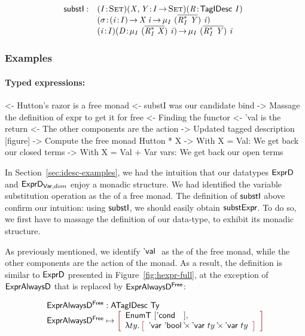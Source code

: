 \[
\begin{array}{@{}ll}
\substI : & \PITEL{\V{I}}{\Set}
            \PITEL{\V{X}, \V{Y}}{\V{I} \To \Set}
            \PITEL{\V{R}}{\TagIDesc{\V{I}}} \\
          & \PITEL{\V{\sigma}}{\PI{\V{i}}{\V{I}} \V{X}\:\V{i} \To 
                               \IMu{I}{(\toIDesc{\FreeIMonad{\V{R}}{\V{I}}{\V{Y}}})}{\V{i}}} \\
          & \PITEL{\V{i}}{\V{I}}
            \PITEL{\V{D}}{\IMu{I}{(\toIDesc{\FreeIMonad{\V{R}}{\V{I}}{\V{X}}})}{\V{i}}} \To
            \IMu{I}{(\toIDesc{\FreeIMonad{\V{R}}{\V{I}}{\V{Y}}})}{\V{i}}
\end{array}
\]


\subsubsection{Examples}

\paragraph{Typed expressions:}

\begin{wstructure}
<- Hutton's razor is a free monad
    <- substI was our candidate bind
        -> Massage the definition of expr to get it for free
    <- Finding the functor
        <- 'val is the return
        <- The other components are the action
        -> Updated tagged description [figure]
    -> Compute the free monad Hutton * X
        -> With X = Val: We get back our closed terms
        -> With X = Val + Var vars: We get back our open terms
\end{wstructure}

In Section~\ref{sec:idesc-examples}, we had the intuition that our
datatypes $\HExprD$ and $\HExprVarD{dom}$ enjoy a monadic structure. We had
identified the variable substitution operation as the \bind of a free
monad. The definition of $\substI$ above confirm our intuition: using
$\substI$, we should easily obtain $\substH$. To do so, we first have
to massage the definition of our data-type, to exhibit its monadic
structure.

As previously mentioned, we identify $\Eval{}$ as the \return of the
free monad, while the other components are the action of the monad. As
a result, the definition is similar to $\HExprD$ presented in
Figure~\ref{fig:hexpr-full}, at the exception of $\HExprAD$ that is
replaced by $\HExprAFreeD$:

\[\stk{
\HExprAFreeD : \ATagIDesc{\Ty} \\
\HExprAFreeD \mapsto \bigRedBracket{
                 \begin{array}{l}
                   \EnumT{\red{[}\Econd{}{}{}\red{]}} \red{,} \\
                   \LAM{ty}
                   \bigRedBracket{
                   \begin{array}{l}
                   \DProd{\DVar{\Ebool}}{\DProd{\DVar{ty}}{\DVar{ty}}}
                   \end{array}
                   }
                 \end{array}
                 }
}\]

